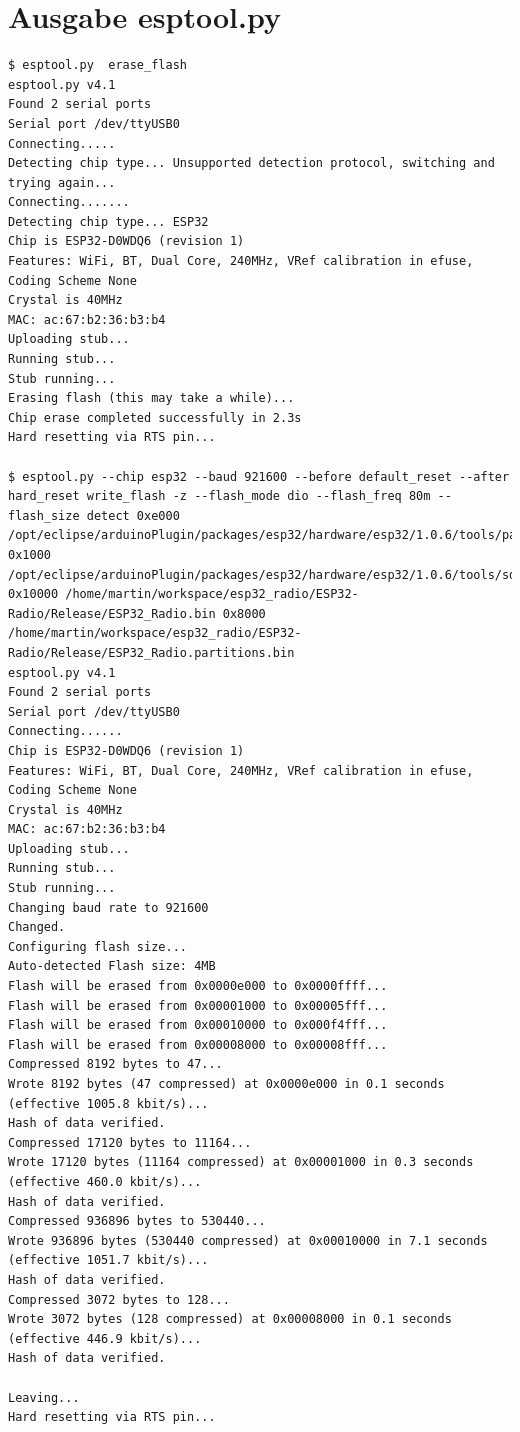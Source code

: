 \documentclass[ngerman,11pt,parskip=half] {scrartcl}
\begin{document}
\section{Ausgabe esptool.py}

\begin{lstlisting}
$ esptool.py  erase_flash
esptool.py v4.1
Found 2 serial ports
Serial port /dev/ttyUSB0
Connecting.....
Detecting chip type... Unsupported detection protocol, switching and trying again...
Connecting.......
Detecting chip type... ESP32
Chip is ESP32-D0WDQ6 (revision 1)
Features: WiFi, BT, Dual Core, 240MHz, VRef calibration in efuse, Coding Scheme None
Crystal is 40MHz
MAC: ac:67:b2:36:b3:b4
Uploading stub...
Running stub...
Stub running...
Erasing flash (this may take a while)...
Chip erase completed successfully in 2.3s
Hard resetting via RTS pin...

$ esptool.py --chip esp32 --baud 921600 --before default_reset --after hard_reset write_flash -z --flash_mode dio --flash_freq 80m --flash_size detect 0xe000 /opt/eclipse/arduinoPlugin/packages/esp32/hardware/esp32/1.0.6/tools/partitions/boot_app0.bin 0x1000 /opt/eclipse/arduinoPlugin/packages/esp32/hardware/esp32/1.0.6/tools/sdk/bin/bootloader_dio_80m.bin 0x10000 /home/martin/workspace/esp32_radio/ESP32-Radio/Release/ESP32_Radio.bin 0x8000 /home/martin/workspace/esp32_radio/ESP32-Radio/Release/ESP32_Radio.partitions.bin 
esptool.py v4.1
Found 2 serial ports
Serial port /dev/ttyUSB0
Connecting......
Chip is ESP32-D0WDQ6 (revision 1)
Features: WiFi, BT, Dual Core, 240MHz, VRef calibration in efuse, Coding Scheme None
Crystal is 40MHz
MAC: ac:67:b2:36:b3:b4
Uploading stub...
Running stub...
Stub running...
Changing baud rate to 921600
Changed.
Configuring flash size...
Auto-detected Flash size: 4MB
Flash will be erased from 0x0000e000 to 0x0000ffff...
Flash will be erased from 0x00001000 to 0x00005fff...
Flash will be erased from 0x00010000 to 0x000f4fff...
Flash will be erased from 0x00008000 to 0x00008fff...
Compressed 8192 bytes to 47...
Wrote 8192 bytes (47 compressed) at 0x0000e000 in 0.1 seconds (effective 1005.8 kbit/s)...
Hash of data verified.
Compressed 17120 bytes to 11164...
Wrote 17120 bytes (11164 compressed) at 0x00001000 in 0.3 seconds (effective 460.0 kbit/s)...
Hash of data verified.
Compressed 936896 bytes to 530440...
Wrote 936896 bytes (530440 compressed) at 0x00010000 in 7.1 seconds (effective 1051.7 kbit/s)...
Hash of data verified.
Compressed 3072 bytes to 128...
Wrote 3072 bytes (128 compressed) at 0x00008000 in 0.1 seconds (effective 446.9 kbit/s)...
Hash of data verified.

Leaving...
Hard resetting via RTS pin...
\end{lstlisting}
\end{document}
